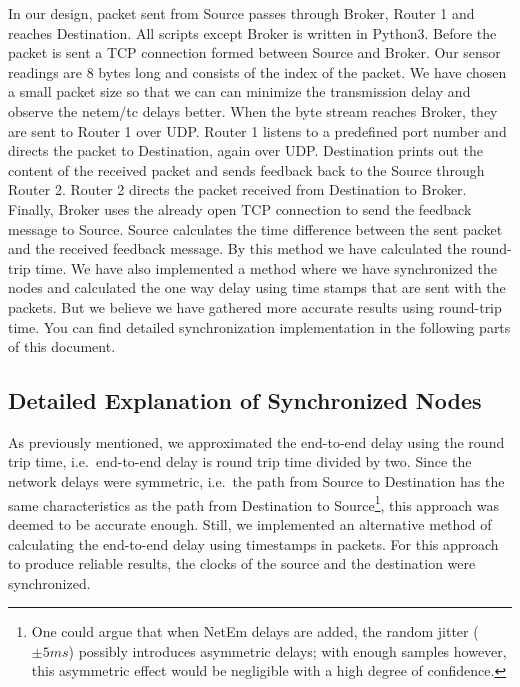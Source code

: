 \documentclass[conference]{IEEEtran}
\begin{document}
In our design, packet sent from Source passes through Broker, Router 1 and reaches Destination. All scripts except Broker is written in Python3. Before the packet is sent a TCP connection formed between Source and Broker. Our sensor readings are 8 bytes long and consists of the index of the packet. We have chosen a small packet size so that we can can minimize the transmission delay and observe the netem/tc delays better. When the byte stream reaches Broker, they are sent to Router 1 over UDP\@. Router 1 listens to a predefined port number and directs the packet to Destination, again over UDP\@. Destination prints out the content of the received packet and sends feedback back to the Source through Router 2. Router 2 directs the packet received from Destination to Broker. Finally, Broker uses the already open TCP connection to send the feedback message to Source. Source calculates the time difference between the sent packet and the received feedback message. By this method we have calculated the round-trip time. We have also implemented a method where we have synchronized the nodes and calculated the one way delay using time stamps that are sent with the packets. But we believe we have gathered more accurate results using round-trip time. You can find detailed synchronization implementation in the following parts of this document.

\subsection{Detailed Explanation of Synchronized Nodes}
As previously mentioned, we approximated the end-to-end delay using the round trip time, i.e.\
end-to-end delay is round trip time divided by two. Since the network delays were
symmetric, i.e.\ the path from Source to Destination has the same characteristics as the
path from Destination to Source\footnote{One could argue that when NetEm delays
are added, the random jitter ($\pm 5ms$) possibly introduces asymmetric delays;
with enough samples however, this asymmetric effect would be negligible with a high degree of confidence.},
this approach was deemed to be accurate enough.
Still, we implemented an alternative method of calculating the end-to-end delay using
timestamps in packets. For this approach to produce reliable results, the clocks
of the source and the destination were synchronized.
\end{document}
